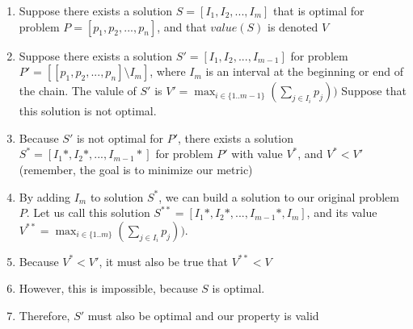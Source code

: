\documentclass{article}
\begin{document}
\begin{enumerate}
	\item Suppose there exists a solution 
	$S = [I_1, I_2, ..., I_m]$ that is optimal for problem 
	$P = [p_1, p_2, ..., p_n]$, and that $value(S)$ is denoted $V$
	\item Suppose there exists a solution $S' = [I_1, I_2, ..., I_{m-1}]$ for
	problem $P'= [[p_1, p_2, ..., p_n] \setminus I_m]$, where $I_m$ is an
	interval at the beginning or end of the chain. The valule of $S'$ is
	$V' = \max_{i\in\{1..m-1\}}(\sum_{j \in{I_i}} p_j))$ 
	Suppose that this solution is not optimal.
	\item Because $S'$ is not optimal for $P'$, there exists a solution $S^* =
	[I_1*, I_2*, ..., I_{m-1}*]$ for problem $P'$ with value $V^*$, and $V^* <
	V'$ \\(remember, the goal is to minimize our metric) 

	\item By adding $I_m$ to solution $S^*$, we can build a solution to our
	original problem $P$. Let us call this solution $S^{**} = [I_1*, I_2*, ...,
	I_{m-1}*, I_m]$, and its value $V^{**} = \max_{i\in\{1..m\}}(\sum_{j
	\in{I_i}} p_j))$.

	\item Because $V^{*} < V'$, it must also be true that $V^{**} < V$

	\item However, this is impossible, because $S$ is optimal. 
	\item Therefore, $S'$ must also be optimal and our property is valid
\end{enumerate}
\end{document}
